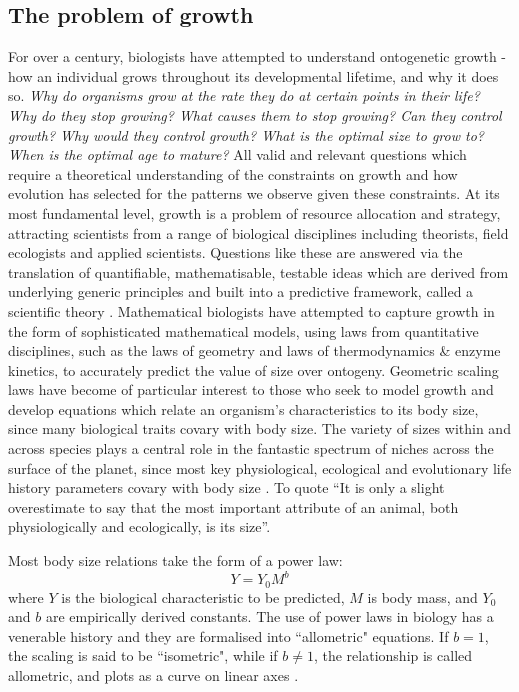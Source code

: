 \documentclass[a4paper]{article} %
\begin{document}
    \subsection{The problem of growth}
        For over a century, biologists have attempted to understand ontogenetic growth - how an individual grows throughout its developmental lifetime, and why it does so. \textit{Why do organisms grow at the rate they do at certain points in their life? Why do they stop growing? What causes them to stop growing? Can they control growth? Why would they control growth? What is the optimal size to grow to? When is the optimal age to mature?} All valid and relevant questions which require a theoretical understanding of the constraints on growth and how evolution has selected for the patterns we observe given these constraints. At its most fundamental level, growth is a problem of resource allocation and strategy, attracting scientists from a range of biological disciplines including theorists, field ecologists and applied scientists. Questions like these are answered via the translation of quantifiable, mathematisable, testable ideas which are derived from underlying generic principles and built into a predictive framework, called a scientific theory \autocite{popper1962,popper1972,peters1983, West2011}. Mathematical biologists have attempted to capture growth in the form of sophisticated mathematical models, using laws from quantitative disciplines, such as the laws of geometry and laws of thermodynamics \& enzyme kinetics, to accurately predict the value of size over ontogeny. Geometric scaling laws have become of particular interest to those who seek to model growth and develop equations which relate an organism's characteristics to its body size, since many biological traits covary with body size. The variety of sizes within and across species plays a central role in the fantastic spectrum of niches across the surface of the planet, since most key physiological, ecological and evolutionary life history parameters covary with body size \autocite{peters1983, brown2000-scaling-book,schmidt1984scaling,Marshall2019b}. To quote \cite{Bartholomew1981} ``It is only a slight overestimate to say that the most important attribute of an animal, both physiologically and ecologically, is its size''. 

        Most body size relations take the form of a power law:
        \begin{equation*}
            Y = Y_0 M^b
        \end{equation*}
        where $Y$ is the biological characteristic to be predicted, $M$ is body mass, and $Y_0$ and $b$ are empirically derived constants. The use of power laws in biology has a venerable history and they are formalised into ``allometric" equations. If $b = 1$, the scaling is said to be ``isometric", while if $b \neq 1$, the relationship is called allometric, and plots as a curve on linear axes \autocite{brown2000-scaling-book}.
\end{document}
